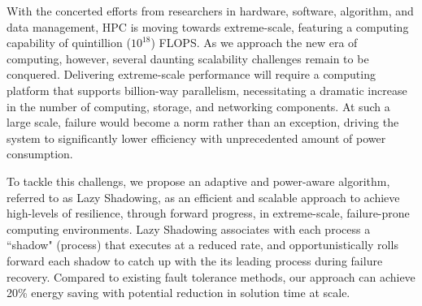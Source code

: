 With the concerted efforts from researchers in hardware, software, algorithm, and data management, HPC is moving towards extreme-scale, featuring a computing capability of quintillion ($10^{18}$) FLOPS. 
As we approach the new era of computing, however, several daunting scalability challenges remain to be conquered. Delivering extreme-scale performance will require a computing platform that supports billion-way parallelism, necessitating a dramatic increase in the number of computing, storage, and networking components. At such a large scale, failure would become a norm rather than an exception, driving the system to significantly lower efficiency with unprecedented amount of power consumption. %

To tackle this challengs, we propose an adaptive and power-aware algorithm, referred to as Lazy Shadowing, as an efficient and scalable approach to achieve high-levels of resilience, through forward progress, in extreme-scale, failure-prone computing environments. 
Lazy Shadowing associates with each process a ``shadow" (process) that executes at a reduced rate, and opportunistically rolls forward each shadow to catch up with the its leading process during failure recovery.
Compared to existing fault tolerance methods, our approach can achieve 20\% energy saving with potential reduction in solution time at scale.
